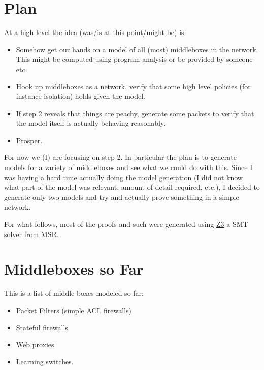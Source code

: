 \documentclass[11pt]{article}
\begin{document}
\section{Plan}
At a high level the idea (was/is at this point/might be) is:
\begin{itemize}
\item Somehow get our hands on a model of all (most) middleboxes in the
network. This might be computed using program analysis or be provided by
someone etc.
\item Hook up middleboxes as a network, verify that some high level policies (for instance isolation) holds given the model. 
\item If step 2 reveals that things are peachy, generate some packets to verify that the model itself is actually behaving reasonably.
\item Prosper.
\end{itemize}

For now we (I) are focusing on step 2. In particular the plan is to generate models for a variety of middleboxes and
see what we could do with this. Since I was having a hard time actually doing the model generation (I did not know what
part of the model was relevant, amount of detail required, etc.), I decided to generate only two models and try and
actually prove something in a simple network.

For what follows, most of the proofs and such were generated using \href{http://z3.codeplex.com/}{Z3} a SMT solver from
MSR.

\section{Middleboxes so Far}
This is a list of middle boxes modeled so far:
\begin{itemize}
\item Packet Filters (simple ACL firewalls)
\item Stateful firewalls
\item Web proxies
\item Learning switches.
\end{itemize}
\end{document}
